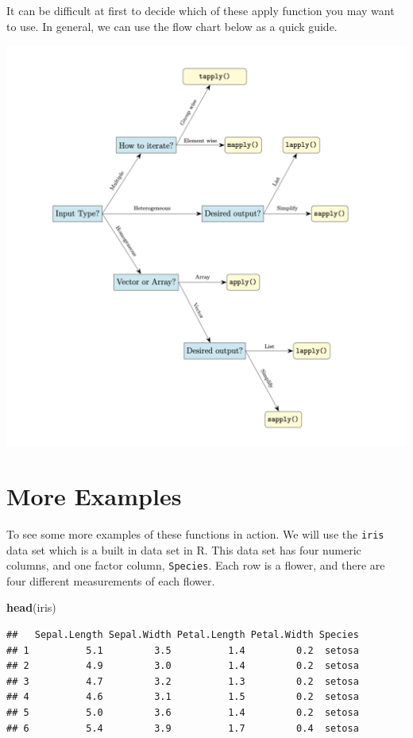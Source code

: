 \documentclass[
]{book}
\newenvironment{Shaded}{\begin{snugshade}}{\end{snugshade}}
\newcommand{\KeywordTok}[1]{\textcolor[rgb]{0.13,0.29,0.53}{\textbf{#1}}}
\newcommand{\NormalTok}[1]{#1}
\begin{document}
It can be difficult at first to decide which of these apply function you may want to use. In general, we can use the flow chart below as a quick guide.

\includegraphics{images/apply_flowchart.png}

\hypertarget{more-examples}{%
\section{More Examples}\label{more-examples}}

To see some more examples of these functions in action. We will use the \texttt{iris} data set which is a built in data set in R. This data set has four numeric columns, and one factor column, \texttt{Species}. Each row is a flower, and there are four different measurements of each flower.

\begin{Shaded}
\begin{Highlighting}[]
\KeywordTok{head}\NormalTok{(iris)}
\end{Highlighting}
\end{Shaded}

\begin{verbatim}
##   Sepal.Length Sepal.Width Petal.Length Petal.Width Species
## 1          5.1         3.5          1.4         0.2  setosa
## 2          4.9         3.0          1.4         0.2  setosa
## 3          4.7         3.2          1.3         0.2  setosa
## 4          4.6         3.1          1.5         0.2  setosa
## 5          5.0         3.6          1.4         0.2  setosa
## 6          5.4         3.9          1.7         0.4  setosa
\end{verbatim}
\end{document}
